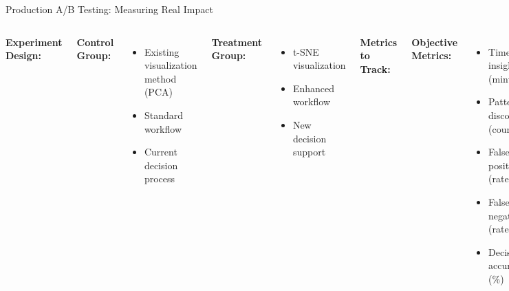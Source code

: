 \documentclass[aspectratio=169]{beamer}
\begin{document}
\begin{frame}{Production A/B Testing: Measuring Real Impact}
\begin{columns}
\textbf{Experiment Design:}

\textbf{Control Group:}
\begin{itemize}
\item Existing visualization method (PCA)
\item Standard workflow
\item Current decision process
\end{itemize}

\textbf{Treatment Group:}
\begin{itemize}
\item t-SNE visualization
\item Enhanced workflow
\item New decision support
\end{itemize}

\textbf{Metrics to Track:}

\textbf{Objective Metrics:}
\begin{itemize}
\item Time to insight (minutes)
\item Patterns discovered (count)
\item False positives (rate)
\item False negatives (rate)
\item Decision accuracy (\%)
\end{itemize}

\textbf{Subjective Metrics:}
\begin{itemize}
\item User confidence (Likert 1-5)
\item Ease of use (Likert 1-5)
\item Perceived value (Likert 1-5)
\end{itemize}

\textbf{Example Results:}

\end{columns}
\end{frame}
\end{document}
